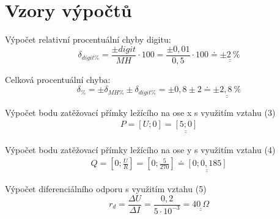 \section{Vzory výpočtů}
  
  Výpočet relativní procentuální chyby digitu:
  \begin{equation}
    \delta _{digit\%} = \dfrac{\pm digit}{MH} \cdot 100 = \dfrac{\pm 0,01}{0,5} \cdot 100 \doteq \underline{\underline{\pm 2~\%}}
    \nonumber
  \end{equation}
  
  Celková procentuální chyba:
  \begin{equation}
    \delta_{\%} = \pm\delta_{MH\%} \pm \delta_{digit\%} = \pm 0,8 \pm 2 \doteq \underline{\underline{\pm 2,8~\%}}
    \nonumber
  \end{equation} 
  
  
  Výpočet bodu zatěžovací přímky ležícího na ose x s využitím vztahu (3)
  \begin{eqnarray}
      P = [U; 0] = \underline{\underline{[5; 0]}}
      \nonumber
    \end{eqnarray}
    
  Výpočet bodu zatěžovací přímky ležícího na ose y s využitím vztahu (4)
  \begin{eqnarray}
      Q = \left[0; \frac{U}{R}\right] = \left[0; \frac{5}{270}\right] \doteq \underline{\underline{[0; 0,185]}}
      \nonumber
    \end{eqnarray}
    
    
  Výpočet diferenciálního odporu s využitím vztahu (5)  
  \begin{equation}
    r_d = \dfrac{\Delta U}{\Delta I} = \dfrac{0,2}{5\cdot 10^{-3}} = \underline{\underline{40~\Omega}}
    \nonumber
  \end{equation}
  
